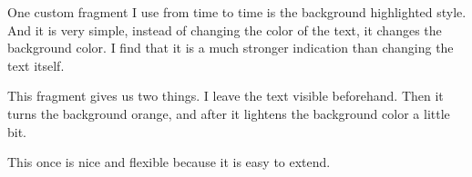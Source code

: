 \documentclass[
  letterpaper,
  DIV=11,
  numbers=noendperiod]{scrreprt}
\newenvironment{Shaded}{\begin{snugshade}}{\end{snugshade}}
\newcommand{\BuiltInTok}[1]{\textcolor[rgb]{0.00,0.23,0.31}{#1}}
\newcommand{\ConstantTok}[1]{\textcolor[rgb]{0.56,0.35,0.01}{#1}}
\newcommand{\DataTypeTok}[1]{\textcolor[rgb]{0.68,0.00,0.00}{#1}}
\newcommand{\DecValTok}[1]{\textcolor[rgb]{0.68,0.00,0.00}{#1}}
\newcommand{\FunctionTok}[1]{\textcolor[rgb]{0.28,0.35,0.67}{#1}}
\newcommand{\KeywordTok}[1]{\textcolor[rgb]{0.00,0.23,0.31}{\textbf{#1}}}
\newcommand{\NormalTok}[1]{\textcolor[rgb]{0.00,0.23,0.31}{#1}}
\newcommand{\OperatorTok}[1]{\textcolor[rgb]{0.37,0.37,0.37}{#1}}
\newcommand{\VariableTok}[1]{\textcolor[rgb]{0.07,0.07,0.07}{#1}}
\begin{document}
One custom fragment I use from time to time is the background
highlighted style. And it is very simple, instead of changing the color
of the text, it changes the background color. I find that it is a much
stronger indication than changing the text itself.

This fragment gives us two things. I leave the text visible beforehand.
Then it turns the background orange, and after it lightens the
background color a little bit.

\begin{Shaded}
\end{Shaded}

This once is nice and flexible because it is easy to extend.
\end{document}
